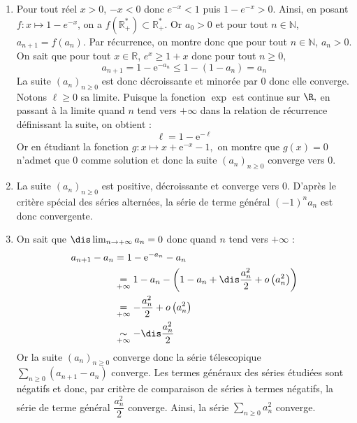 \documentclass[a4paper,10pt]{report}
\newcommand{\Sum}[2]{\ensuremath{\textstyle{\sum\limits_{#1}^{#2}}}}
\begin{document}
\corr \begin{enumerate}
\item Pour tout réel $x>0$, $-x<0$ donc $e^{-x}<1$ puis $1-e^{-x}>0$. Ainsi, en posant $f: x \mapsto 1-e^{-x}$, on a $f(\mathbb{R}_+^{*}) \subset \mathbb{R}_+^{*}$. Or $a_0 >0$ et pour tout $n \in \mathbb{N}$, $a_{n+1}=f(a_n)$. Par récurrence, on montre donc que pour tout $n \in \mathbb{N}$, $a_n >0$. On sait que pour tout $x \in \mathbb{R}$, $e^x \geq 1+x$ donc pour tout $n \geq 0$,
 $$a_{n+1}=1- {\mathrm{e}}^{ - a_n } \leq 1-(1-a_n)=a_n$$
La suite $(a_n)_{n \geq 0}$ est donc d\'ecroissante et minorée par $0$ donc elle converge. Notons $\ell\geq 0$ sa limite. Puisque la fonction $\exp$ est continue sur $\R,$ en passant \`a la limite quand $n$ tend vers $+\infty$ dans la relation de récurrence définissant la suite, on obtient :
$$\ell= 1 - {\mathrm{e}}^{ - \ell }$$
Or en \'etudiant la fonction $g : x\longmapsto x+{\mathrm{e}}^{ - x }-1,$ on montre que $g(x)=0$ n'admet que $0$ comme solution et donc la suite $(a_n)_{n \geq 0}$ converge vers $0$.
\item La suite $(a_n)_{n \geq 0}$ est positive, décroissante et converge vers $0$. D'après le critère spécial des séries alternées, la série de terme général $(-1)^n a_n$ est donc convergente. 
\item On sait que $\dis\lim_{n\to+\infty}a_n=0$ donc quand $n$ tend vers $+ \infty$ :
\begin{align*}
a_{n+1}-a_n & = 1 - {\mathrm{e}}^{ - a_n }-a_n \\
&  \underset{+ \infty}{=} 1-a_n-\left(1-a_n+\dis\frac{a_n^2}{2} + o \left(a_n^2\right)\right) \\
& \underset{+ \infty}{=} - \dfrac{a_n^2}{2} + o\left(a_n^2\right)\\
& \underset{+ \infty}{\sim} -\dis\frac{a_n^2}{2} \\
\end{align*}
Or la suite $(a_n)_{n \geq 0}$ converge donc la s\'erie t\'elescopique $\Sum{n \geq 0}{} (a_{n+1}-a_n)$ converge. Les termes généraux des séries étudiées sont négatifs et donc, par critère de comparaison de séries à termes négatifs, la s\'erie de terme général $\dfrac{a_n^2}{2}$ converge. Ainsi, la s\'erie $\Sum{n \geq 0}{} a_n^2$ converge.


\end{enumerate}
\end{document}
